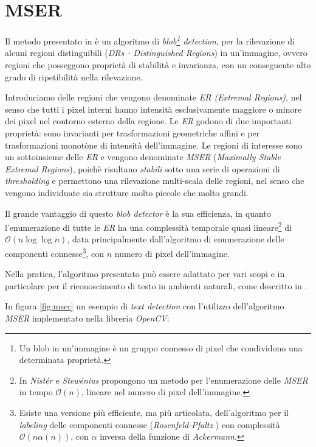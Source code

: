 \section{MSER}
Il metodo presentato in \cite{bib:mser} \`e un algoritmo di \textit{blob\footnote{Un blob in un'immagine \`e un gruppo connesso di pixel che condividono una determinata propriet\`a.} detection}, per la rilevazione di alcuni regioni distinguibili (\textit{DRs - Distinguished Regions}) in un'immagine, ovvero regioni che posseggono propriet\`a di stabilit\`a e invarianza, con un conseguente alto grado di ripetibilit\`a nella rilevazione.\par
Introduciamo delle regioni che vengono denominate \textit{ER (Extremal Regions)}, nel senso che tutti i pixel interni hanno intensit\`a esclusivamente maggiore o minore dei pixel nel contorno esterno della regione. Le \textit{ER} godono di due importanti propriet\`a: sono invarianti per trasformazioni geometriche affini e per trasformazioni monot\`one di intensit\`a dell'immagine. Le regioni di interesse sono un sottoinsieme delle \textit{ER} e vengono denominate \textit{MSER} (\textit{Maximally Stable Extremal Regions}), poich\`e risultano \textit{stabili} sotto una serie di operazioni di \textit{thresholding} e permettono una rilevazione multi-scala delle regioni, nel senso che vengono individuate sia strutture molto piccole che molto grandi.\par
Il grande vantaggio di questo \textit{blob detector} \`e la sua efficienza, in quanto l'enumerazione di tutte le \textit{ER} ha una complessit\`a temporale quasi lineare\footnote{In \cite{bib:mser-linear} \textit{Nist\'er} e \textit{Stew\'enius} propongono un metodo per l'enumerazione delle \textit{MSER} in tempo $\mathcal{O}(n)$, lineare nel numero di pixel dell'immagine.} di $\mathcal{O}(n\log{}\log{}n)$, data principalmente dall'algoritmo di enumerazione delle componenti connesse\footnote{Esiste una versione pi\`u efficiente, ma pi\`u articolata, dell'algoritmo per il \textit{labeling} delle componenti connesse (\textit{Rosenfeld-Pfaltz} \cite{bib:connected-components-fast}) con complessit\`a $\mathcal{O}(n\alpha(n))$, con $\alpha$ inversa della funzione di \textit{Ackermann}.}, con $n$ numero di pixel dell'immagine.\par
Nella pratica, l'algoritmo presentato pu\`o essere adattato per vari scopi e in particolare per il riconoscimento di testo in ambienti naturali, come descritto in \cite{bib:mser-canny}.\par
In figura \ref{fig:mser} un esempio di \textit{text detection} con l'utilizzo dell'algoritmo \textit{MSER} implementato nella libreria \textit{OpenCV}:

